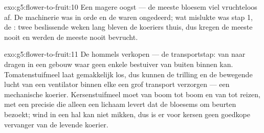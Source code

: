 \begin{solution}{exo:g5:flower-to-fruit:10}
Een magere oogst --- de meeste bloesem viel vruchteloos af. De
machinerie was in orde en de  waren ongedeerd; wat mislukte was
stap 1, de : twee beslissende weken lang bleven de koeriers
thuis, dus kregen de meeste  nooit  en werden de meeste
 nooit bevrucht.
\end{solution}

\begin{solution}{exo:g5:flower-to-fruit:11}
De hommels verkopen  --- de transportstap:  van
 naar  dragen in een gebouw waar geen enkele bestuiver
van buiten binnen kan. Tomatenstuifmeel laat gemakkelijk los, dus kunnen
de trilling en de bewegende lucht van een ventilator binnen elke 
een grof transport verzorgen --- een mechanische koerier. Kersenstuifmeel
moet van boom tot boom en van  tot  reizen, met een precisie
die alleen een lichaam levert dat de bloesems om beurten bezoekt; wind
in een hal kan niet mikken, dus is er voor kersen geen goedkope
vervanger van de levende koerier.
\end{solution}
